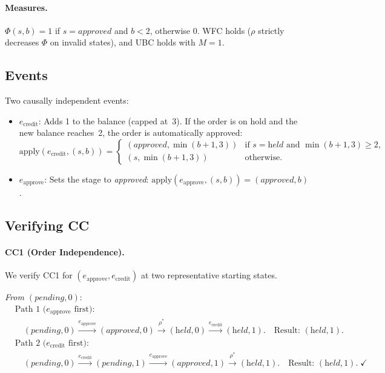 \documentclass[11pt,a4paper]{article}
\theoremstyle{plain}
\theoremstyle{definition}
\theoremstyle{remark}
\begin{document}
\paragraph{Measures.}
$\Phi(s, b) = 1$ if $s = \textit{approved}$ and $b < 2$, otherwise $0$.
WFC holds ($\rho$ strictly decreases $\Phi$ on invalid states), and UBC holds
with $M = 1$.

\subsection{Events}

Two causally independent events:
\begin{itemize}[leftmargin=*,nosep]
\item $e_{\mathrm{credit}}$: Adds 1 to the balance (capped at~3).  If the
  order is on hold and the new balance reaches~2, the order is automatically
  approved:
  \[
  \mathrm{apply}(e_{\mathrm{credit}}, (s, b)) =
  \begin{cases}
  (\textit{approved}, \min(b{+}1, 3)) & \text{if } s = \textit{held} \text{ and } \min(b{+}1,3) \geq 2, \\
  (s, \min(b{+}1, 3)) & \text{otherwise.}
  \end{cases}
  \]
\item $e_{\mathrm{approve}}$: Sets the stage to \textit{approved}:
  $\mathrm{apply}(e_{\mathrm{approve}}, (s, b)) = (\textit{approved}, b)$.
\end{itemize}

\subsection{Verifying CC}

\paragraph{CC1 (Order Independence).}
We verify CC1 for $(e_{\mathrm{approve}}, e_{\mathrm{credit}})$ at two
representative starting states.

\emph{From $(\textit{pending}, 0)$}:
\begin{align*}
&\text{Path 1 ($e_{\mathrm{approve}}$ first):} \\
&\quad (\textit{pending}, 0) \xrightarrow{e_{\mathrm{approve}}}
  (\textit{approved}, 0) \xrightarrow{\rho^*} (\textit{held}, 0)
  \xrightarrow{e_{\mathrm{credit}}} (\textit{held}, 1).
  \quad\text{Result: } (\textit{held}, 1). \\[4pt]
&\text{Path 2 ($e_{\mathrm{credit}}$ first):} \\
&\quad (\textit{pending}, 0) \xrightarrow{e_{\mathrm{credit}}}
  (\textit{pending}, 1) \xrightarrow{e_{\mathrm{approve}}}
  (\textit{approved}, 1) \xrightarrow{\rho^*} (\textit{held}, 1).
  \quad\text{Result: } (\textit{held}, 1). \;\checkmark
\end{align*}
\end{document}
